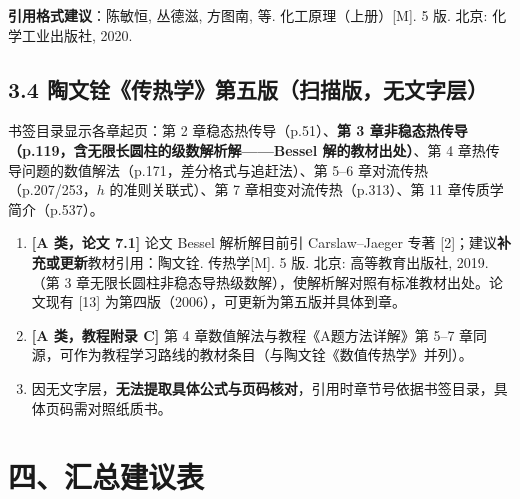 \documentclass[12pt,a4paper]{ctexart}
\begin{document}
\textbf{引用格式建议}：陈敏恒, 丛德滋, 方图南, 等. 化工原理（上册）[M]. 5 版. 北京: 化学工业出版社, 2020.

\subsection{3.4 陶文铨《传热学》第五版（扫描版，无文字层）}

书签目录显示各章起页：第 2 章稳态热传导（p.51）、\textbf{第 3 章非稳态热传导（p.119，含无限长圆柱的级数解析解——Bessel 解的教材出处）}、第 4 章热传导问题的数值解法（p.171，差分格式与追赶法）、第 5--6 章对流传热（p.207/253，$h$ 的准则关联式）、第 7 章相变对流传热（p.313）、第 11 章传质学简介（p.537）。

\begin{enumerate}[leftmargin=2em]
\item \textbf{[A 类，论文 7.1]} 论文 Bessel 解析解目前引 Carslaw--Jaeger 专著 [2]；建议\textbf{补充或更新}教材引用：陶文铨. 传热学[M]. 5 版. 北京: 高等教育出版社, 2019.（第 3 章无限长圆柱非稳态导热级数解），使解析解对照有标准教材出处。论文现有 [13] 为第四版（2006），可更新为第五版并具体到章。
\item \textbf{[A 类，教程附录 C]} 第 4 章数值解法与教程《A题方法详解》第 5--7 章同源，可作为教程学习路线的教材条目（与陶文铨《数值传热学》并列）。
\item 因无文字层，\textbf{无法提取具体公式与页码核对}，引用时章节号依据书签目录，具体页码需对照纸质书。
\end{enumerate}

\section{四、汇总建议表}
\end{document}
